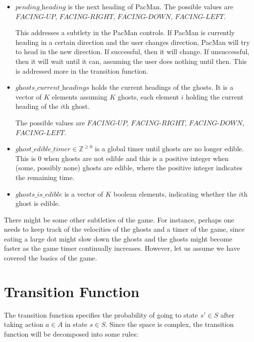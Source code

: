 \documentclass[paper=a4, fontsize=11pt]{scrartcl}
\begin{document}
\begin{itemize}
\item $\textit{pending\_heading}$ is the next heading of PacMan. The possible values are $\textit{FACING-UP}$, $\textit{FACING-RIGHT}$, $\textit{FACING-DOWN}$, $\textit{FACING-LEFT}$.

This addresses a subtlety in the PacMan controls. If PacMan is currently heading in a certain direction and the user changes direction, PacMan will try to head in the new direction. If successful, then it will change. If unsuccessful, then it will wait until it can, assuming the user does nothing until then. This is addressed more in the transition function.

\item $\textit{ghosts\_current\_headings}$ holds the current headings of the ghosts. It is a vector of $K$ elements assuming $K$ ghosts, each element $i$ holding the current heading of the $i$th ghost. 

The possible values are $\textit{FACING-UP}$, $\textit{FACING-RIGHT}$, $\textit{FACING-DOWN}$, $\textit{FACING-LEFT}$.

\item $\textit{ghost\_edible\_timer} \in \mathbb{Z}^{\geq 0}$ is a global timer until ghosts are no longer edible. This is $0$ when ghosts are not edible and this is a positive integer when (some, possibly none) ghosts are edible, where the positive integer indicates the remaining time.

\item $\textit{ghosts\_is\_edible}$ is a vector of $K$ boolean elements, indicating whether the $i$th ghost is edible.
\end{itemize}

There might be some other subtleties of the game. For instance, perhaps one needs to keep track of the velocities of the ghosts and a timer of the game, since eating a large dot might slow down the ghosts and the ghosts might become faster as the game timer continually increases.  However, let us assume we have covered the basics of the game.

\section{Transition Function}

The transition function specifies the probability of going to state $s' \in S$ after taking action $a \in A$ in state $s \in S$.  Since the space is complex, the transition function will be decomposed into some rules:
\end{document}
